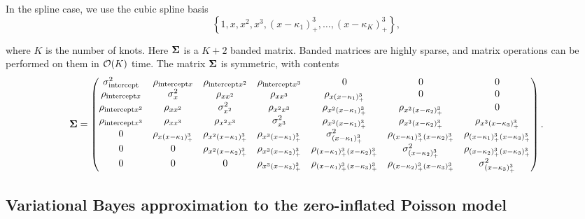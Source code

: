 
In the spline case, we use the cubic spline basis 
$$
\left\{ 
1, x, x^2, x^3, (x -
\kappa_1)^3_+, \ldots, (x - \kappa_K)^3_+ \right\}, 
$$

\noindent where $K$ is the number of knots.
Here ${\boldsymbol \Sigma}$ is a $K + 2$ banded matrix.  Banded matrices are highly sparse,
and matrix operations can be performed on them in $\mathcal{O}(K)$ time. The matrix
${\boldsymbol \Sigma}$ is symmetric, with contents
{
\tiny{
\[
	{\boldsymbol \Sigma} =
	\begin{pmatrix}
        \sigma^2_{\text{intercept}}&\rho_{\text{intercept} x}&\rho_{\text{intercept} x^2}&\rho_{\text{intercept} x^3}&0&0&0\\
        \rho_{\text{intercept} x}&\sigma^2_x&\rho_{x x^2}&\rho_{x x^3}&\rho_{x (x - \kappa_1)^3_+}&0&0\\
        \rho_{\text{intercept} x^2}&\rho_{x x^2}&\sigma^2_{x^2}&\rho_{x^2 x^3}&\rho_{x^2 (x-\kappa_1)_+^3}&\rho_{x^2 (x-\kappa_2)_+^3}&0\\
        \rho_{\text{intercept} x^3}&\rho_{x x^3}&\rho_{x^2 x^3}&\sigma^2_{x^3}&\rho_{x^3 (x - \kappa_1)_+^3}&\rho_{x^3 (x-\kappa_2)_+^3}&\rho_{x^3 (x - \kappa_3)_+^3}\\
        0&\rho_{x (x - \kappa_1)^3_+}&\rho_{x^2 (x-\kappa_1)_+^3}&\rho_{x^3 (x - \kappa_1)_+^3}&\sigma^2_{(x - \kappa_1)_+^3}&\rho_{(x-\kappa_1)_+^3 (x-\kappa_2)_+^3}&\rho_{(x - \kappa_1)_+^3 (x - \kappa_3)_+^3}\\
        0&0&\rho_{x^2 (x-\kappa_2)_+^3}&\rho_{x^3 (x-\kappa_2)_+^3}&\rho_{(x-\kappa_1)_+^3 (x-\kappa_2)_+^3}&\sigma^2_{(x - \kappa_2)_+^3}&\rho_{(x - \kappa_2)_+^3 (x - \kappa_3)_+^3}\\
        0&0&0&\rho_{x^3 (x - \kappa_3)_+^3}&\rho_{(x - \kappa_1)_+^3 (x - \kappa_3)_+^3}&\rho_{(x - \kappa_2)_+^3 (x - \kappa_3)_+^3}&\sigma^2_{(x - \kappa_3)_+^3}\\
	\end{pmatrix}.
\]
}
}

\subsection{Variational Bayes approximation to the zero-inflated Poisson model}

